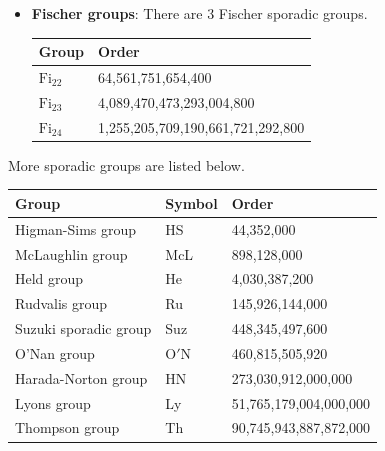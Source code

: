 \begin{itemize}
    \newpage

    \item \textbf{Fischer groups}: There are 3 Fischer sporadic groups.
    \begin{table}[h]
        \centering
        \begin{tabular}{|l|l|}
            \hline
            \textbf{Group}     & \textbf{Order}                    \\ \hline
            $\mathrm{Fi}_{22}$ & 64,561,751,654,400                \\ \hline
            $\mathrm{Fi}_{23}$ & 4,089,470,473,293,004,800         \\ \hline
            $\mathrm{Fi}_{24}$ & 1,255,205,709,190,661,721,292,800 \\ \hline
        \end{tabular}
    \end{table}
\end{itemize}

More sporadic groups are listed below.
\begin{table}[h]
    \centering
    \begin{tabular}{|l|l|l|}
        \hline
        \textbf{Group}        & \textbf{Symbol} & \textbf{Order}  \\ \hline
        Higman-Sims group\index{Higman-Sims group}     & HS              & 44,352,000      \\ \hline
        McLaughlin group\index{McLaughlin group}      & McL             & 898,128,000     \\ \hline
        Held group\index{Held group}            & He              & 4,030,387,200   \\ \hline
        Rudvalis group\index{Rudvalis group}        & Ru              & 145,926,144,000 \\ \hline
        Suzuki sporadic group\index{Suzuki sporadic group} & Suz             & 448,345,497,600 \\ \hline
        O'Nan group\index{O'Nan group}           & $\mathrm{O'N}$  & 460,815,505,920 \\ \hline
        Harada-Norton group\index{Harada-Norton group}   & HN              & 273,030,912,000,000    \\ \hline
        Lyons group\index{Lyons group}           & Ly              & 51,765,179,004,000,000 \\ \hline
        Thompson group\index{Thompson group}        & Th              & 90,745,943,887,872,000 \\ \hline
    \end{tabular}
\end{table}

